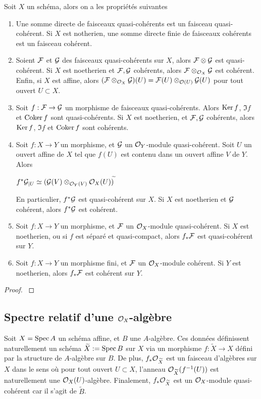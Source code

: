 \begin{prop}\label{FQCProps3}
Soit $X$ un schéma, alors on a les propriétés suivantes
\begin{enumerate}
\item Une somme directe de faisceaux quasi-cohérents est un faisceau quasi-cohérent. Si $X$ est notherien, une somme directe finie de faisceaux cohérents est un faisceau cohérent.
\item Soient $\mathcal{F}$ et $\mathcal{G}$ des faisceaux quasi-cohérents sur $X$, alors $\mathcal{F}\otimes \mathcal{G}$ est quasi-cohérent. Si $X$ est noetherien et $\mathcal{F},\mathcal{G}$ cohérents, alors $\mathcal{F}\otimes_{\mathcal{O}_X} \mathcal{G}$ est cohérent. Enfin, si $X$ est affine, alors $(\mathcal{F}\otimes_{\mathcal{O}_X}\mathcal{G})(U)=\mathcal{F}(U)\otimes_{\mathcal{O}(U)}\mathcal{G}(U)$ pour tout ouvert $U\subset X$.
\item Soit $f:\mathcal{F}\rightarrow \mathcal{G}$ un morphisme de faisceaux quasi-cohérents. Alors $\operatorname{Ker} f$, $\Im f$ et $\operatorname{Coker} f$ sont quasi-cohérents. Si $X$ est noetherien, et $\mathcal{F}, \mathcal{G}$ cohérents, alors $\operatorname{Ker} f$, $\Im f$ et $\operatorname{Coker} f$ sont cohérents.
\item Soit $f:X\rightarrow Y$ un morphisme, et $\mathcal{G}$ un $\mathcal{O}_Y$-module quasi-cohérent. Soit $U$ un ouvert affine de $X$ tel que $f(U)$ est contenu dans un ouvert affine $V$ de $Y$. Alors
\begin{center}
$f^*\mathcal{G}_{|U}\simeq(\mathcal{G}(V)\otimes_{\mathcal{O}_Y(V)}\mathcal{O}_X(U))^{\widetilde{}}$
\end{center}
En particulier, $f^*\mathcal{G}$ est quasi-cohérent sur $X$. Si $X$ est noetherien et $\mathcal{G}$ cohérent, alors $f^*\mathcal{G}$ est cohérent.
\item Soit $f:X\rightarrow Y$ un morphisme, et $\mathcal{F}$ un $\mathcal{O}_X$-module quasi-cohérent. Si $X$ est noetherien, ou si $f$ est séparé et quasi-compact, alors $f_*\mathcal{F}$ est quasi-cohérent sur $Y$.
\item Soit $f:X\rightarrow Y$ un morphisme fini, et $\mathcal{F}$ un $\mathcal{O}_X$-module cohérent. Si $Y$ est noetherien, alors $f_*\mathcal{F}$ est cohérent sur $Y$.
\end{enumerate}
\end{prop}
\begin{proof}
\cite[5.1.14]{QingLiu}
\end{proof}

\subsection{Spectre relatif d'une $\mathcal{O}_X$-algèbre}

Soit $X=\operatorname{Spec} A$ un schéma affine, et $B$ une $A$-algèbre. Ces données définissent naturellement un schéma $\widetilde{X}:=\operatorname{Spec} B$ sur $X$ via un morphisme $f:\widetilde{X}\rightarrow X$ défini par la structure de $A$-algèbre sur $B$. De plus, $f_*\mathcal{O}_{\widetilde{X}}$ est un faisceau d'algèbres sur $X$ dans le sens où pour tout ouvert $U\subset X$, l'anneau $\mathcal{O}_{\widetilde{X}}(f^{-1}(U))$ est naturellement une $\mathcal{O}_X(U)$-algèbre. Finalement, $f_*\mathcal{O}_{\widetilde{X}}$ est un $\mathcal{O}_X$-module quasi-cohérent car il s'agit de $\widetilde{B}$.

